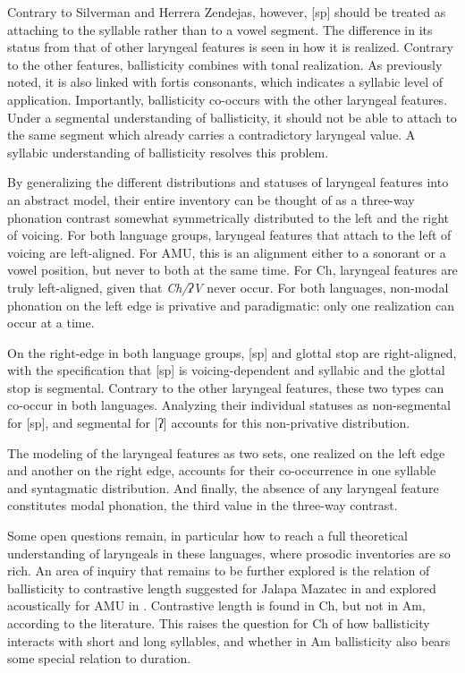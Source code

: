 \documentclass[output=paper]{langscibook}
\begin{document}
Contrary to Silverman and Herrera Zendejas, however, [sp] should be treated as attaching to the syllable rather than to a vowel segment. The difference in its status from that of other laryngeal features is seen in how it is realized. Contrary to the other features, ballisticity combines with tonal realization. As previously noted, it is also linked with fortis consonants, which indicates a syllabic level of application. Importantly, ballisticity co-occurs with the other laryngeal features. Under a segmental understanding of ballisticity, it should not be able to attach to the same segment which already carries a contradictory laryngeal value. A syllabic understanding of ballisticity resolves this problem. 

By generalizing the different distributions and statuses of laryngeal features into an abstract model, their entire inventory can be thought of as a three-way phonation contrast somewhat symmetrically distributed to the left and the right of voicing. For both language groups, laryngeal features that attach to the left of voicing are left-aligned. For AMU, this is an alignment either to a sonorant or a vowel position, but never to both at the same time. For Ch, laryngeal features are truly left-aligned, given that \textit{Ch/ʔV} never occur. For both languages, non-modal phonation on the left edge is privative and paradigmatic: only one realization can occur at a time. 

On the right-edge in both language groups, [sp] and glottal stop are right-aligned, with the specification that [sp] is voicing-dependent and syllabic and the glottal stop is segmental. Contrary to the other laryngeal features, these two types can co-occur in both languages. Analyzing their individual statuses as non-segmental for [sp], and segmental for [ʔ] accounts for this non-privative distribution.

The modeling of the laryngeal features as two sets, one realized on the left edge and another on the right edge, accounts for their co-occurrence in one syllable and syntagmatic distribution. And finally, the absence of any laryngeal feature constitutes modal phonation, the third value in the three-way contrast. 

Some open questions remain, in particular how to reach a full theoretical understanding of laryngeals in these languages, where prosodic inventories are so rich. An area of inquiry that remains to be further explored is the relation of ballisticity to contrastive length suggested for Jalapa Mazatec in \citet{SilvermanEtAl1995} and explored acoustically for AMU in \citet{ApóstolPolancoforthcoming}. Contrastive length is found in Ch, but not in Am, according to the literature. This raises the question for Ch of how ballisticity interacts with short and long syllables, and whether in Am ballisticity also bears some special relation to duration.
\end{document}
